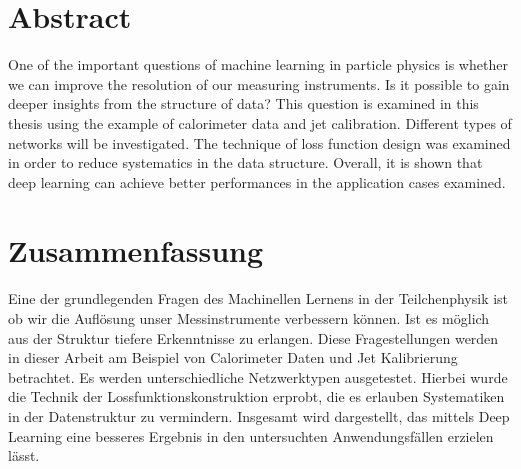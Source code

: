 

\chapter*{Abstract}

One of the important questions of machine learning in particle physics
is whether we can improve the resolution of our measuring
instruments. Is it possible to gain deeper insights from the structure
of data? This question is examined in this thesis using the example of
calorimeter data and jet calibration. Different types of networks will
be investigated. The technique of loss function design was examined in
order to reduce systematics in the data structure. Overall, it is
shown that deep learning can achieve better performances in the
application cases examined.

\chapter*{Zusammenfassung}
Eine der grundlegenden Fragen des Machinellen Lernens in der
Teilchenphysik ist ob wir die Auflösung unser Messinstrumente
verbessern können. Ist es möglich aus der Struktur tiefere
Erkenntnisse zu erlangen. Diese Fragestellungen werden in dieser
Arbeit am Beispiel von Calorimeter Daten und Jet Kalibrierung
betrachtet. Es werden unterschiedliche Netzwerktypen
ausgetestet. Hierbei wurde die Technik der Lossfunktionskonstruktion
erprobt, die es erlauben Systematiken in der Datenstruktur zu
vermindern. Insgesamt wird dargestellt, das mittels Deep Learning eine
besseres Ergebnis in den untersuchten Anwendungsfällen erzielen lässt.
